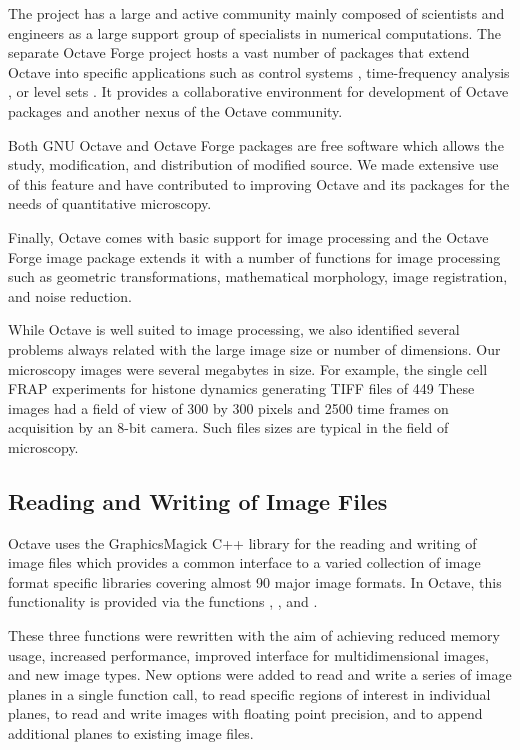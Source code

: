 The project has a large and active community
mainly composed of
scientists and engineers as a large support group of
specialists in numerical computations.
The separate Octave Forge project hosts a vast number of
packages that extend Octave into specific applications such as control
systems \citep{octave-control}, time-frequency analysis
\citep{octave-ltfat}, or level sets \citep{octave-level-set}.
It provides a collaborative environment for development of Octave
packages and another nexus of the Octave community.

Both GNU Octave and Octave Forge packages are free software which allows
the study, modification, and distribution of modified source.
We made extensive
use of this feature and have contributed to improving Octave and its
packages for the needs of quantitative microscopy.

Finally, Octave comes with basic support for image processing and the
Octave Forge image package extends it with a number of functions for
image processing such as geometric transformations, mathematical
morphology, image registration, and noise reduction.

While Octave is well suited to image
processing, we also identified several problems always related with
the large image size or number of dimensions.  Our microscopy images
were several megabytes in size.  For example, the single cell
FRAP experiments for histone dynamics generating TIFF files of 449
These images had a field of view of 300
by 300 pixels and 2500 time frames
on acquisition by an 8-bit camera.
Such files sizes are typical in the field of microscopy.

\subsection{Reading and Writing of Image Files}

Octave uses the GraphicsMagick C++ library for the reading and writing
of image files which provides a common interface
to a varied collection of
image format specific libraries covering almost
90 major image formats.  In Octave, this functionality is
provided via the functions , , and
.

These three functions were rewritten with the aim of achieving
reduced memory usage, increased performance, improved
interface for multidimensional images, and new image types.
New options were added to read and write a series of image planes
in a single function call, to read specific regions of interest in
individual planes, to read and write images
with floating point precision, and to append additional planes to existing image
files.

